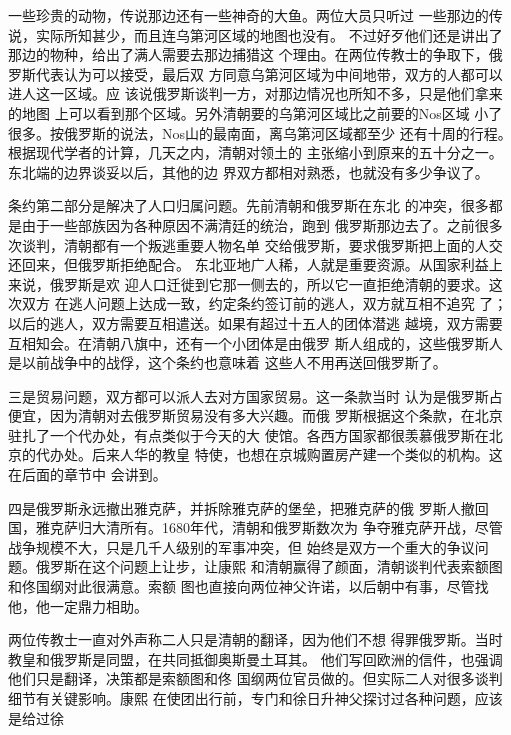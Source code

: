 一些珍贵的动物，传说那边还有一些神奇的大鱼。两位大员只听过%
一些那边的传说，实际所知甚少，而且连乌第河区域的地图也没有。%
不过好歹他们还是讲出了那边的物种，给出了满人需要去那边捕猎这%
个理由。在两位传教士的争取下，俄罗斯代表认为可以接受，最后双%
方同意乌第河区域为中间地带，双方的人都可以进人这一区域。应%
该说俄罗斯谈判一方，对那边情况也所知不多，只是他们拿来的地图%
上可以看到那个区域。另外清朝要的乌第河区域比之前要的Nos区域%
小了很多。按俄罗斯的说法，Nos山的最南面，离乌第河区域都至少%
还有十周的行程。根据现代学者的计算，几天之内，清朝对领土的%
主张缩小到原来的五十分之一。东北端的边界谈妥以后，其他的边%
界双方都相对熟悉，也就没有多少争议了。%
\par
条约第二部分是解决了人口归属问题。先前清朝和俄罗斯在东北%
的冲突，很多都是由于一些部族因为各种原因不满清廷的统治，跑到%
俄罗斯那边去了。之前很多次谈判，清朝都有一个叛逃重要人物名单%
交给俄罗斯，要求俄罗斯把上面的人交还回来，但俄罗斯拒绝配合。%
东北亚地广人稀，人就是重要资源。从国家利益上来说，俄罗斯是欢%
迎人口迁徙到它那一侧去的，所以它一直拒绝清朝的要求。这次双方%
在逃人问题上达成一致，约定条约签订前的逃人，双方就互相不追究%
了；以后的逃人，双方需要互相遣送。如果有超过十五人的团体潜逃%
越境，双方需要互相知会。在清朝八旗中，还有一个小团体是由俄罗%
斯人组成的，这些俄罗斯人是以前战争中的战俘，这个条约也意味着%
这些人不用再送回俄罗斯了。%
\par
三是贸易问题，双方都可以派人去对方国家贸易。这一条款当时%
认为是俄罗斯占便宜，因为清朝对去俄罗斯贸易没有多大兴趣。而俄%
罗斯根据这个条款，在北京驻扎了一个代办处，有点类似于今天的大%
使馆。各西方国家都很羡慕俄罗斯在北京的代办处。后来人华的教皇%
特使，也想在京城购置房产建一个类似的机构。这在后面的章节中%
会讲到。%
\par
四是俄罗斯永远撤出雅克萨，并拆除雅克萨的堡垒，把雅克萨的俄%
罗斯人撤回国，雅克萨归大清所有。1680年代，清朝和俄罗斯数次为%
争夺雅克萨开战，尽管战争规模不大，只是几千人级别的军事冲突，但%
始终是双方一个重大的争议问题。俄罗斯在这个问题上让步，让康熙%
和清朝赢得了颜面，清朝谈判代表索额图和佟国纲对此很满意。索额%
图也直接向两位神父许诺，以后朝中有事，尽管找他，他一定鼎力相助。%
\par
两位传教士一直对外声称二人只是清朝的翻译，因为他们不想%
得罪俄罗斯。当时教皇和俄罗斯是同盟，在共同抵御奥斯曼土耳其。%
他们写回欧洲的信件，也强调他们只是翻译，决策都是索额图和佟%
国纲两位官员做的。但实际二人对很多谈判细节有关键影响。康熙%
在使团出行前，专门和徐日升神父探讨过各种问题，应该是给过徐%
